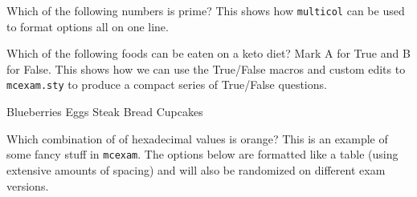 \documentclass[twoside]{article}
\begin{document}
\begin{mcquestions}

\question Which of the following numbers is prime? This shows how \texttt{multicol} can be used to format options all on one line.

\begin{multicols}{4}
\begin{mcanswerslist}[ordinal]
\end{mcanswerslist}
\end{multicols}

\begin{mcquestioninstruction}
\numq[5] Which of the following foods can be eaten on a keto diet? Mark A for True and B for False. This shows how we can use the True/False macros and custom edits to \texttt{mcexam.sty} to produce a compact series of True/False questions. 
\end{mcquestioninstruction}

\question         Blueberries \qtrue
\question[follow] Eggs        \qtrue
\question[follow] Steak       \qtrue
\question[follow] Bread       \qfalse
\question[follow] Cupcakes    \qfalse


\question Which combination of of hexadecimal values is orange? This is an example of some fancy stuff in \texttt{mcexam}. The options below are formatted like a table (using extensive amounts of spacing) and will also be randomized on different exam versions.

\begin{mcanswers}

\bigskip
\begin{minipage}{0.5\textwidth}
\hspace{2.2em}\hfill{}\hfill{}\par

\quad{}\par

\quad{}\par

\quad{}\par

\quad{}\par

\quad{}
\end{minipage}

\end{mcanswers}




\end{mcquestions}

 
\end{document}
